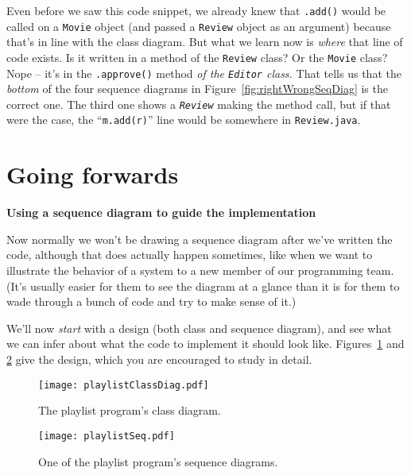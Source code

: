 \begin{enumerate}
Even before we saw this code snippet, we already knew that \texttt{.add()}
would be called on a \texttt{Movie} object (and passed a \texttt{Review}
object as an argument) because that's in line with the class diagram. But what
we learn now is \textit{where} that line of code exists. Is it written in a
method of the \texttt{Review} class? Or the \texttt{Movie} class? Nope -- it's
in the \texttt{.approve()} method \textit{of the \texttt{Editor} class.} That
tells us that the \textit{bottom} of the four sequence diagrams in
Figure~\ref{fig:rightWrongSeqDiag} is the correct one. The third one shows a
\textit{\texttt{Review}} making the method call, but if that were the case,
the ``\texttt{m.add(r)}'' line would be somewhere in \texttt{Review.java}.

\end{enumerate}

\section{Going forwards}

\vspace{-.1in}
{\large \textbf{Using a sequence diagram to guide the implementation}}

Now normally we won't be drawing a sequence diagram after we've written the
code, although that does actually happen sometimes, like when we want to
illustrate the behavior of a system to a new member of our programming team.
(It's usually easier for them to see the diagram at a glance than it is for
them to wade through a bunch of code and try to make sense of it.)

We'll now \textit{start} with a design (both class and sequence diagram), and
see what we can infer about what the code to implement it should look like.
Figures~\ref{fig:playlistClassDiag} and \ref{fig:playlistSeq} give the design,
which you are encouraged to study in detail.

\begin{figure}
\hspace*{-.3in}
\centering
\texttt{[image: playlistClassDiag.pdf]}
\caption{The playlist program's class diagram.}
\label{fig:playlistClassDiag}

\end{figure}
\begin{figure}
\centering
\hspace*{-.3in}
\texttt{[image: playlistSeq.pdf]}
\vspace{.1in}
\caption{One of the playlist program's sequence diagrams.}
\quad\quad\quad\quad\quad %
\label{fig:playlistSeq}
\end{figure}

